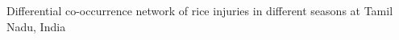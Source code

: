 Differential co-occurrence network of rice injuries in different seasons at Tamil Nadu, India
\label{fig:difseasonTM}